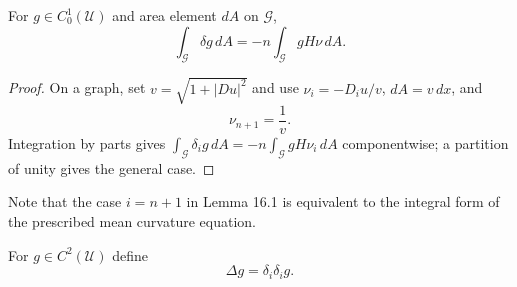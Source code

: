 \begin{lemma}\label{gilbarg-trudinger.lem.16.1.tangential-integration-by-parts}
For $g\in C^1_0(\mathcal U)$ and area element $dA$ on $\mathcal G$,
\begin{equation}\tag{16.10}
\int_{\mathcal G}\delta g\,dA=-n\int_{\mathcal G}gH\nu\,dA.
\end{equation}
\end{lemma}
\begin{proof}
\sketch On a graph, set $v=\sqrt{1+|Du|^2}$ and use $\nu_i=-D_i u/v$, $dA=v\,dx$, and
\begin{equation}\tag{16.11}
\nu_{n+1}=\frac1v.
\end{equation}
Integration by parts gives $\int_{\mathcal G}\delta_i g\,dA=-n\int_{\mathcal G}gH\nu_i\,dA$ componentwise; a partition of unity gives the general case.
\end{proof}

Note that the case $i=n+1$ in Lemma 16.1 is equivalent to the integral form of
the prescribed mean curvature equation.
\begin{definition}\label{gilbarg-trudinger.def.laplace-beltrami}
For $g\in C^2(\mathcal U)$ define
\begin{equation}\tag{16.12}
\Delta g=\delta_i\delta_i g.
\end{equation}
\end{definition}

